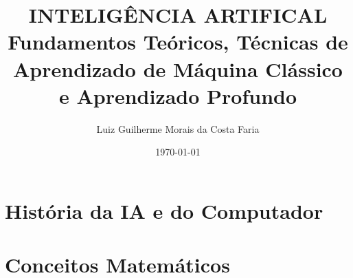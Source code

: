\documentclass[
    12pt,            %
    a4paper,         %
    book,            %
    openright,       %
    twoside,         %
    brazil,          %
    citacao=authoryear
]{abntex2}
\title{INTELIGÊNCIA ARTIFICAL \\ 
    \large Fundamentos Teóricos, Técnicas de Aprendizado de Máquina Clássico e Aprendizado Profundo}
\author{Luiz Guilherme Morais da Costa Faria}
\date{\today} %
\begin{document}
\frontmatter

\imprimircapa
\imprimirfolhaderosto


\tableofcontents

\mainmatter

\part{História da IA e do Computador}




\part{Conceitos Matemáticos}
\end{document}
